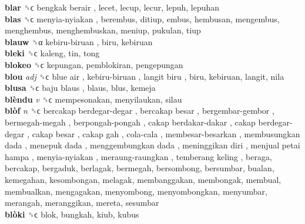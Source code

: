 \textbf{blar} ␝ϲ   bengkak berair , lecet, lecup, lecur, lepuh, lepuhan  \\
\textbf{blas} ␝ϲ   menyia-nyiakan , berembus, ditiup, embus, hembusan, mengembus, menghembus, menghembuskan, meniup, pukulan, tiup  \\
\textbf{blauw} ␝α   kebiru-biruan , biru, kebiruan  \\
\textbf{bleki} ␝ϲ  kaleng, tin, tong  \\
\textbf{blokeo} ␝ϲ  kepungan, pemblokiran, pengepungan  \\
\textbf{blou} \emph{adj}  ␝ϲ   blue air ,  kebiru-biruan ,  langit biru , biru, kebiruan, langit, nila  \\
\textbf{blusa} ␝ϲ   baju blaus , blaus, blus, kemeja  \\
\textbf{blèndu} \emph{v}  ␝ϲ  mempesonakan, menyilaukan, silau  \\
\textbf{blòf} \emph{n}  ␝ϲ   bercakap berdegar-degar ,  bercakap besar ,  bergembar-gembor ,  bermegah-megah ,  berpongah-pongah ,  cakap berdakar-dakar ,  cakap berdegar-degar ,  cakap besar ,  cakap gah ,  cola-cala ,  membesar-besarkan ,  membusungkan dada ,  menepuk dada ,  menggembungkan dada ,  meninggikan diri ,  menjual petai hampa ,  menyia-nyiakan ,  meraung-raungkan ,  temberang keling , beraga, bercakap, bergaduk, berlagak, bermegah, bersombong, bersumbar, bualan, kemegahan, kesombongan, melagak, membanggakan, membongak, membual, membualkan, mengagakan, menyombong, menyombongkan, menyumbar, merangah, meranggikan, mereta, sesumbar  \\
\textbf{blòki} ␝ϲ  blok, bungkah, kiub, kubus  \\

